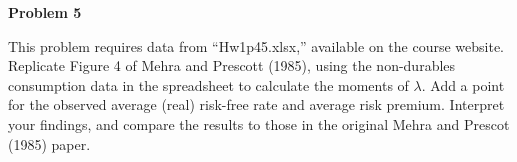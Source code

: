 \documentclass[12pt]{article}
\begin{document}
\noindent \textbf{Problem 5}

This problem requires data from ``Hw1p45.xlsx,'' available on the course website. Replicate Figure 4 of Mehra and Prescott (1985), using the non-durables consumption data in the spreadsheet to calculate the moments of $\lambda$. Add a point for the observed average (real) risk-free rate and average risk premium. Interpret your findings, and compare the results to those in the original Mehra and Prescot (1985) paper. 


\end{document}
